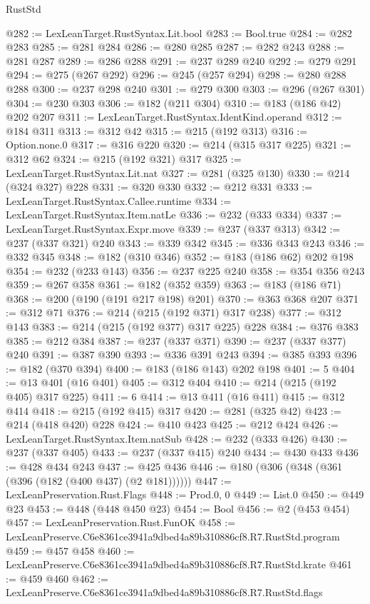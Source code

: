 \begin{lexlean}{RustStd}
\begin{coremodule}
@282 := LexLeanTarget.RustSyntax.Lit.bool
@283 := Bool.true
@284 := @282 @283
@285 := @281 @284
@286 := @280 @285
@287 := @282 @243
@288 := @281 @287
@289 := @286 @288
@291 := @237 @289 @240
@292 := @279 @291
@294 := @275 (@267 @292)
@296 := @245 (@257 @294)
@298 := @280 @288 @288
@300 := @237 @298 @240
@301 := @279 @300
@303 := @296 (@267 @301)
@304 := @230 @303
@306 := @182 (@211 @304)
@310 := @183 (@186 @42) @202 @207
@311 := LexLeanTarget.RustSyntax.IdentKind.operand
@312 := @184 @311
@313 := @312 @42
@315 := @215 (@192 @313)
@316 := Option.none.{0}
@317 := @316 @220
@320 := @214 (@315 @317 @225)
@321 := @312 @62
@324 := @215 (@192 @321) @317
@325 := LexLeanTarget.RustSyntax.Lit.nat
@327 := @281 (@325 @130)
@330 := @214 (@324 @327) @228
@331 := @320 @330
@332 := @212 @331
@333 := LexLeanTarget.RustSyntax.Callee.runtime
@334 := LexLeanTarget.RustSyntax.Item.natLe
@336 := @232 (@333 @334)
@337 := LexLeanTarget.RustSyntax.Expr.move
@339 := @237 (@337 @313)
@342 := @237 (@337 @321) @240
@343 := @339 @342
@345 := @336 @343 @243
@346 := @332 @345
@348 := @182 (@310 @346)
@352 := @183 (@186 @62) @202 @198
@354 := @232 (@233 @143)
@356 := @237 @225 @240
@358 := @354 @356 @243
@359 := @267 @358
@361 := @182 (@352 @359)
@363 := @183 (@186 @71)
@368 := @200 (@190 (@191 @217 @198) @201)
@370 := @363 @368 @207
@371 := @312 @71
@376 := @214 (@215 (@192 @371) @317 @238)
@377 := @312 @143
@383 := @214 (@215 (@192 @377) @317 @225) @228
@384 := @376 @383
@385 := @212 @384
@387 := @237 (@337 @371)
@390 := @237 (@337 @377) @240
@391 := @387 @390
@393 := @336 @391 @243
@394 := @385 @393
@396 := @182 (@370 @394)
@400 := @183 (@186 @143) @202 @198
@401 := 5
@404 := @13 @401 (@16 @401)
@405 := @312 @404
@410 := @214 (@215 (@192 @405) @317 @225)
@411 := 6
@414 := @13 @411 (@16 @411)
@415 := @312 @414
@418 := @215 (@192 @415) @317
@420 := @281 (@325 @42)
@423 := @214 (@418 @420) @228
@424 := @410 @423
@425 := @212 @424
@426 := LexLeanTarget.RustSyntax.Item.natSub
@428 := @232 (@333 @426)
@430 := @237 (@337 @405)
@433 := @237 (@337 @415) @240
@434 := @430 @433
@436 := @428 @434 @243
@437 := @425 @436
@446 := @180 (@306 (@348 (@361 (@396 (@182 (@400 @437) (@2 @181))))))
@447 := LexLeanPreservation.Rust.Flags
@448 := Prod.{0, 0}
@449 := List.{0}
@450 := @449 @23
@453 := @448 (@448 @450 @23)
@454 := Bool
@456 := @2 (@453 @454)
@457 := LexLeanPreservation.Rust.FunOK
@458 := LexLeanPreserve.C6e8361ce3941a9dbed4a89b310886cf8.R7.RustStd.program
@459 := @457 @458
@460 := LexLeanPreserve.C6e8361ce3941a9dbed4a89b310886cf8.R7.RustStd.krate
@461 := @459 @460
@462 := LexLeanPreserve.C6e8361ce3941a9dbed4a89b310886cf8.R7.RustStd.flags

\end{coremodule}
\end{lexlean}
